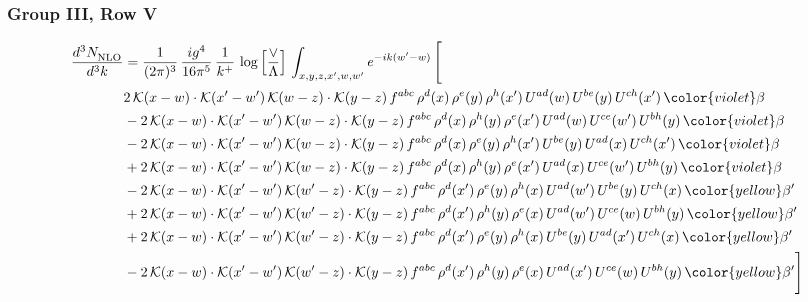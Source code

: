 \subsubsection{Group III, Row V}     
\begin{align}
     \frac{d^{3}N_{\rm NLO}^{\rm}}{d^{3}k}  & = \frac{1}{(2\pi)^{3}}\, \frac{ig^{4}}{16\pi^{5}}\, \frac{1}{k^{+}}\, \log{\left[\frac{\vee}{\Lambda}\right]}\, \int_{x,y,z,x^{\prime},w,w^{\prime}}e^{-ik(w^{\prime}-w)}\, \Bigg[\notag \\ & 2\,\mathcal{K}(x-w)\cdot \mathcal{K}(x'-w')\, \mathcal{K}(w-z)\cdot \mathcal{K}(y-z)\, f^{abc}\,\rho^{d}(x)\,\rho^{e}(y)\,\rho^{h}(x')\, U^{ad}(w)\,U^{be}(y)\,U^{ch}(x')\,{\color{violet} \beta}\notag \\ & -2\,\mathcal{K}(x-w)\cdot \mathcal{K}(x'-w')\, \mathcal{K}(w-z)\cdot \mathcal{K}(y-z)\, f^{abc}\,\rho^{d}(x)\,\rho^{h}(y)\,\rho^{e}(x')\, U^{ad}(w)\,U^{ce}(w')\,U^{bh}(y)\,{\color{violet} \beta}\notag \\ & - 2\,\mathcal{K}(x-w)\cdot \mathcal{K}(x'-w')\, \mathcal{K}(w-z)\cdot \mathcal{K}(y-z)\, f^{abc}\,\rho^{d}(x)\,\rho^{e}(y)\,\rho^{h}(x')\, U^{be}(y)\,U^{ad}(x)\,U^{ch}(x')\,{\color{violet} \beta}\notag \\ & +2\,\mathcal{K}(x-w)\cdot \mathcal{K}(x'-w')\, \mathcal{K}(w-z)\cdot \mathcal{K}(y-z)\, f^{abc}\,\rho^{d}(x)\,\rho^{h}(y)\,\rho^{e}(x')\, U^{ad}(x)\,U^{ce}(w')\,U^{bh}(y)\,{\color{violet} \beta}\notag \\ & -2\, \mathcal{K}(x-w) \cdot \mathcal{K}(x'-w')\, \mathcal{K}(w'-z) \cdot \mathcal{K}(y-z)\, f^{abc}\, \rho^{d}(x')\,\rho^{e}(y)\, \rho^{h}(x)\,U^{ad}(w')\,U^{be}(y)\,U^{ch}(x)\, {\color{yellow} \beta'}\notag \\ & + 2\, \mathcal{K}(x-w) \cdot \mathcal{K}(x'-w')\, \mathcal{K}(w'-z) \cdot \mathcal{K}(y-z)\, f^{abc}\, \rho^{d}(x')\,\rho^{h}(y)\, \rho^{e}(x)\,U^{ad}(w')\,U^{ce}(w)\,U^{bh}(y)\, {\color{yellow} \beta'}\notag \\ & +2\, \mathcal{K}(x-w) \cdot \mathcal{K}(x'-w')\, \mathcal{K}(w'-z) \cdot \mathcal{K}(y-z)\, f^{abc}\, \rho^{d}(x')\,\rho^{e}(y)\, \rho^{h}(x)\,U^{be}(y)\,U^{ad}(x')\,U^{ch}(x)\, {\color{yellow} \beta'}\notag \\ & -2\, \mathcal{K}(x-w) \cdot \mathcal{K}(x'-w')\, \mathcal{K}(w'-z) \cdot \mathcal{K}(y-z)\, f^{abc}\, \rho^{d}(x')\,\rho^{h}(y)\, \rho^{e}(x)\,U^{ad}(x')\,U^{ce}(w)\,U^{bh}(y)\, {\color{yellow} \beta'}\Bigg]
     \end{align} 

